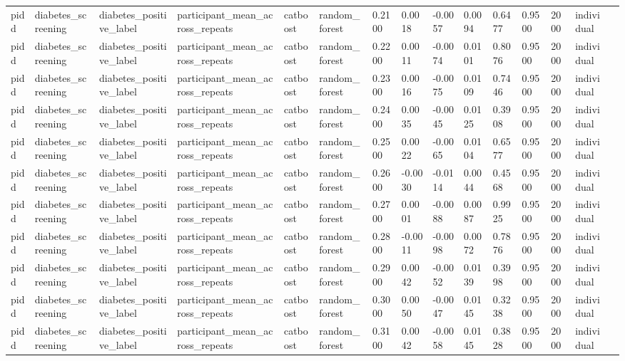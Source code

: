 \begin{tabular}{lllllllllllllll}
pidd & diabetes\_screening & diabetes\_positive\_label & participant\_mean\_across\_repeats & catboost & random\_forest & 0.2100 & 0.0018 & -0.0057 & 0.0094 & 0.6477 & 0.9500 & 2000 & individual &  \\
pidd & diabetes\_screening & diabetes\_positive\_label & participant\_mean\_across\_repeats & catboost & random\_forest & 0.2200 & 0.0011 & -0.0074 & 0.0101 & 0.8076 & 0.9500 & 2000 & individual &  \\
pidd & diabetes\_screening & diabetes\_positive\_label & participant\_mean\_across\_repeats & catboost & random\_forest & 0.2300 & 0.0016 & -0.0075 & 0.0109 & 0.7446 & 0.9500 & 2000 & individual &  \\
pidd & diabetes\_screening & diabetes\_positive\_label & participant\_mean\_across\_repeats & catboost & random\_forest & 0.2400 & 0.0035 & -0.0045 & 0.0125 & 0.3908 & 0.9500 & 2000 & individual &  \\
pidd & diabetes\_screening & diabetes\_positive\_label & participant\_mean\_across\_repeats & catboost & random\_forest & 0.2500 & 0.0022 & -0.0065 & 0.0104 & 0.6577 & 0.9500 & 2000 & individual &  \\
pidd & diabetes\_screening & diabetes\_positive\_label & participant\_mean\_across\_repeats & catboost & random\_forest & 0.2600 & -0.0030 & -0.0114 & 0.0044 & 0.4568 & 0.9500 & 2000 & individual &  \\
pidd & diabetes\_screening & diabetes\_positive\_label & participant\_mean\_across\_repeats & catboost & random\_forest & 0.2700 & 0.0001 & -0.0088 & 0.0087 & 0.9925 & 0.9500 & 2000 & individual &  \\
pidd & diabetes\_screening & diabetes\_positive\_label & participant\_mean\_across\_repeats & catboost & random\_forest & 0.2800 & -0.0011 & -0.0098 & 0.0072 & 0.7876 & 0.9500 & 2000 & individual &  \\
pidd & diabetes\_screening & diabetes\_positive\_label & participant\_mean\_across\_repeats & catboost & random\_forest & 0.2900 & 0.0042 & -0.0052 & 0.0139 & 0.3998 & 0.9500 & 2000 & individual &  \\
pidd & diabetes\_screening & diabetes\_positive\_label & participant\_mean\_across\_repeats & catboost & random\_forest & 0.3000 & 0.0050 & -0.0047 & 0.0145 & 0.3238 & 0.9500 & 2000 & individual &  \\
pidd & diabetes\_screening & diabetes\_positive\_label & participant\_mean\_across\_repeats & catboost & random\_forest & 0.3100 & 0.0042 & -0.0058 & 0.0145 & 0.3828 & 0.9500 & 2000 & individual &  \\

\end{tabular}
